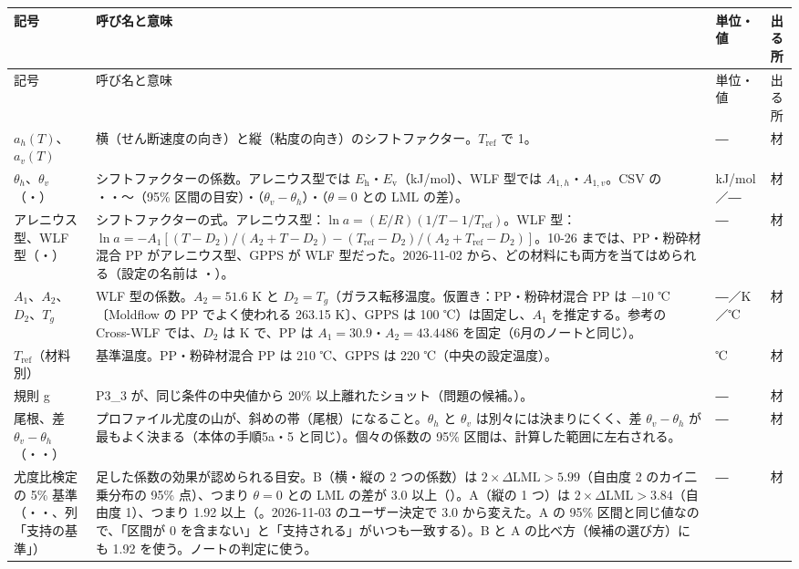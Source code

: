 \documentclass[paper=a4paper,fontsize=10.5pt,line_length=44zw,number_of_lines=38]{jlreq}
\makeatletter
\newcommand{\file}[1]{\texttt{\detokenize{#1}}}
\newcommand{\Eh}{E_{\mathrm{h}}}
\newcommand{\Ev}{E_{\mathrm{v}}}
\newenvironment{symtab}{%
  \begin{longtable}{@{}>{\raggedright\arraybackslash}p{6.5\zw}>{\raggedright\arraybackslash}p{22\zw}>{\raggedright\arraybackslash}p{6\zw}>{\raggedright\arraybackslash}p{4.5\zw}@{}}
  \toprule 記号 & 呼び名と意味 & 単位・値 & 出る所 \\ \midrule \endfirsthead
  \toprule 記号 & 呼び名と意味 & 単位・値 & 出る所 \\ \midrule \endhead
  \bottomrule \endlastfoot}{\end{longtable}}
\makeatother
\begin{document}
\begin{symtab}
$a_h(T)$、$a_v(T)$ & 横（せん断速度の向き）と縦（粘度の向き）のシフトファクター。$T_{\mathrm{ref}}$ で 1。 & ― & 材 \\
$\theta_h$、$\theta_v$（\file{th}・\file{tv}） & シフトファクターの係数。アレニウス型では $\Eh$・$\Ev$（kJ/mol）、WLF 型では $A_{1,h}$・$A_{1,v}$。CSV の \file{th_best}・\file{tv_best}・\file{th_lo}〜\file{tv_hi}（95\% 区間の目安）・\file{diff_best}（$\theta_v-\theta_h$）・\file{dLML_vs_0}（$\theta=0$ との LML の差）。 & kJ/mol／― & 材 \\
アレニウス型、WLF 型（\file{FORMS}・\file{FORM_JA}） & シフトファクターの式。アレニウス型：$\ln a=(E/R)(1/T-1/T_{\mathrm{ref}})$。WLF 型：$\ln a=-A_1[(T-D_2)/(A_2+T-D_2)-(T_{\mathrm{ref}}-D_2)/(A_2+T_{\mathrm{ref}}-D_2)]$。10-26 までは、PP・粉砕材混合 PP がアレニウス型、GPPS が WLF 型だった。2026-11-02 から、どの材料にも両方を当てはめられる（設定の名前は \file{"arrhenius"}・\file{"wlf"}）。 & ― & 材 \\
$A_1$、$A_2$、$D_2$、$T_g$ & WLF 型の係数。$A_2=51.6$ K と $D_2=T_g$（ガラス転移温度。仮置き：PP・粉砕材混合 PP は $-10$ ℃〔Moldflow の PP でよく使われる 263.15 K〕、GPPS は 100 ℃）は固定し、$A_1$ を推定する。参考の Cross-WLF では、$D_2$ は K で、PP は $A_1=30.9$・$A_2=43.4486$ を固定（6月のノートと同じ）。 & ―／K／℃ & 材 \\
$T_{\mathrm{ref}}$（材料別） & 基準温度。PP・粉砕材混合 PP は 210 ℃、GPPS は 220 ℃（中央の設定温度）。 & ℃ & 材 \\
規則 g & P3\_3 が、同じ条件の中央値から 20\% 以上離れたショット（問題の候補。\file{P33_DEV}）。 & ― & 材 \\
尾根、差 $\theta_v-\theta_h$（\file{diff_best}・\file{diff_lo}・\file{diff_hi}） & プロファイル尤度の山が、斜めの帯（尾根）になること。$\theta_h$ と $\theta_v$ は別々には決まりにくく、差 $\theta_v-\theta_h$ が最もよく決まる（本体の手順5a・5 と同じ）。個々の係数の 95\% 区間は、計算した範囲に左右される。 & ― & 材 \\
尤度比検定の 5\% 基準（\file{LRT_DLML}・\file{LRT_DLML_1}・\file{lrt_limit}、列「支持の基準」） & 足した係数の効果が認められる目安。B（横・縦の 2 つの係数）は $2\times\Delta\mathrm{LML}>5.99$（自由度 2 のカイ二乗分布の 95\% 点）、つまり $\theta=0$ との LML の差が 3.0 以上（\file{LRT_DLML}）。A（縦の 1 つ）は $2\times\Delta\mathrm{LML}>3.84$（自由度 1）、つまり 1.92 以上（\file{LRT_DLML_1}。2026-11-03 のユーザー決定で 3.0 から変えた。A の 95\% 区間と同じ値なので、「区間が 0 を含まない」と「支持される」がいつも一致する）。B と A の比べ方（候補の選び方）にも 1.92 を使う。ノートの判定に使う。 & ― & 材 \\

\end{symtab}
\end{document}
